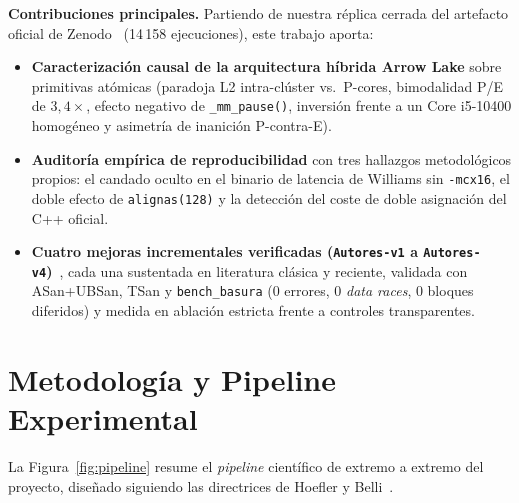 \documentclass[10pt,twocolumn,a4paper]{article}
\begin{document}
\textbf{Contribuciones principales.} Partiendo de nuestra réplica cerrada del artefacto oficial de Zenodo~\cite{dewolff2024artifact,replica2026ultra9} (14\,158 ejecuciones), este trabajo aporta:
\begin{itemize}
  \item \textbf{Caracterización causal de la arquitectura híbrida Arrow Lake} sobre primitivas atómicas (paradoja L2 intra-clúster vs.\ P-cores, bimodalidad P/E de $3{,}4\times$, efecto negativo de \texttt{\_mm\_pause()}, inversión frente a un Core i5-10400 homogéneo y asimetría de inanición P-contra-E).
  \item \textbf{Auditoría empírica de reproducibilidad} con tres hallazgos metodológicos propios: el candado oculto en el binario de latencia de Williams sin \texttt{-mcx16}, el doble efecto de \texttt{alignas(128)} y la detección del coste de doble asignación del C++ oficial.
  \item \textbf{Cuatro mejoras incrementales verificadas (\texttt{Autores-v1} a \texttt{Autores-v4})}~\cite{mejoras2026autores}, cada una sustentada en literatura clásica y reciente, validada con ASan+UBSan, TSan y \texttt{bench\_basura} (0 errores, 0 \emph{data races}, 0 bloques diferidos) y medida en ablación estricta frente a controles transparentes.
\end{itemize}

\section{Metodología y Pipeline Experimental}

La Figura~\ref{fig:pipeline} resume el \emph{pipeline} científico de extremo a extremo del proyecto, diseñado siguiendo las directrices de Hoefler y Belli~\cite{hoefler2015benchmarking}.
\end{document}
